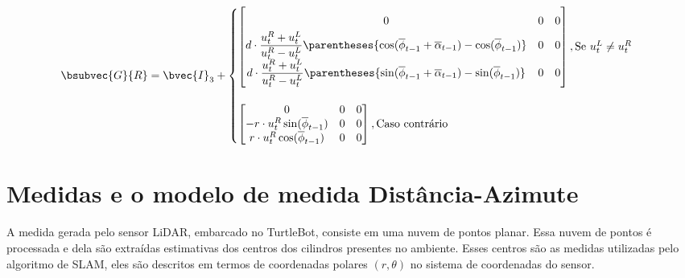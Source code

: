 \begin{equation}
  \bsubvec{G}{R} = \bvec{I}_3 + \begin{cases}
    \renewcommand{\arraystretch}{1.8}
    \begin{bmatrix}
      0 & 0 & 0 \\
      \factor \parentheses{\cos(\overline{\phi}_{t-1} + \overline{\alpha}_{t-1}) - \cos(\overline{\phi}_{t-1})} & 0 & 0 \\
      \factor \parentheses{\sin(\overline{\phi}_{t-1} + \overline{\alpha}_{t-1}) - \sin(\overline{\phi}_{t-1})} & 0 & 0  
    \end{bmatrix}, \text{Se } u_t^L \neq u_t^R \\
    \\
    \renewcommand{\arraystretch}{1}
    \begin{bmatrix}
      0 & 0 & 0 \\
      -r\cdot u_t^R \sin(\overline{\phi}_{t-1}) & 0 & 0 \\
      r\cdot u_t^R \cos(\overline{\phi}_{t-1}) & 0 & 0  
    \end{bmatrix}, \text{Caso contrário}
  \end{cases}
  \label{eq:motion-model-jacobian}
\end{equation}

\section{Medidas e o modelo de medida Distância-Azimute}
\label{sec:slam-measurement}
A medida gerada pelo sensor LiDAR, embarcado no TurtleBot, consiste em uma nuvem de pontos planar. Essa nuvem de pontos é processada e dela são extraídas estimativas dos centros dos cilindros presentes no ambiente. Esses 
centros são as medidas utilizadas pelo algoritmo de SLAM, eles são descritos 
em termos de coordenadas polares $(r, \theta)$ no sistema de coordenadas do sensor.

